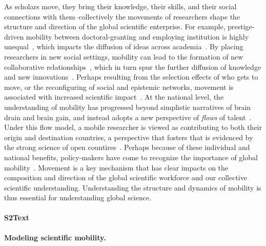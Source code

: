 \documentclass[12pt]{article} %
\begin{document}
As scholars move, they bring their knowledge, their skills, and their social connections with them--collectively the movements of researchers shape the structure and direction of the global scientific enterprise.
For example, prestige-driven mobility between doctoral-granting and employing institution is highly unequal~\autocite{clauset2015hierarchy, deville2014career}, which impacts the diffusion of ideas across academia~\autocite{morgan2018prestige}. 
By placing researchers in new social settings, mobility can lead to the formation of new collaborative relationships~\autocite{rodrigues2016mobility}, which in turn spur the further diffusion of knowledge and new innovations~\autocite{braunerhjelm2020labor, azoulay2011diffusion, kaiser2018innovation, armano2017innovation}. 
Perhaps resulting from the selection effects of who gets to move, or the reconfiguring of social and epistemic networks, movement is associated with increased scientific impact~\autocite{sugimoto2017mostimpact, petersen2018multiscale, jonkers2013return, franzoni2014advantage}. 
At the national level, the understanding of mobility has progressed beyond simplistic narratives of brain drain and brain gain, and instead adopts a new perspective of \textit{flows} of talent~\autocite{meyer2001network, ioannidis2014braindrain, gaillard1998circulation}.
Under this flow model, a mobile researcher is viewed as contributing to both their origin and destination countries, a perspective that fosters that is evidenced by the strong science of open countires~\autocite{wagner2017open}. 
Perhaps because of these individual and national benefits, policy-makers have come to recognize the importance of global mobility~\autocite{box2008competition, oecd2010innovation}. 
Movement is a key mechanism that has clear impacts on the composition and direction of the global scientific workforce and our collective scientific understanding. 
Understanding the structure and dynamics of mobility is thus essential for understanding global science.


%
\paragraph*{S2Text}
\label{si:text:mobility_models}
{\bf Modeling scientific mobility.}
\end{document}
